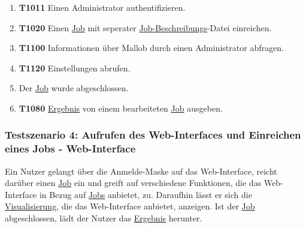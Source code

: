 \begin{enumerate}
        
    \item \textbf{T1011} Einen \gls{Administrator} authentifizieren. 
    
    \item \textbf{T1020} Einen \hyperref[B:Jobs]{Job} mit seperater \hyperref[B:Job-Beschreibung]{Job-Beschreibungs}-Datei einreichen. 
    
    \item \textbf{T1100} Informationen über \gls{Mallob} durch einen \gls{Administrator} abfragen. 
    
    \item \textbf{T1120} Einstellungen abrufen.

    \item Der  \hyperref[B:Jobs]{Job} wurde abgeschlossen.
    
    \item \textbf{T1080} \hyperref[B:Job-Ergebnis]{Ergebnis} von einem bearbeiteten  \hyperref[B:Jobs]{Job} ausgeben. 
    
\end{enumerate}

\subsubsection{Testszenario 4: Aufrufen des Web-Interfaces und Einreichen eines Jobs - Web-Interface}
Ein \gls{Nutzer} gelangt über die Anmelde-Maske auf das \gls{Web-Interface}, reicht darüber einen \hyperref[B:Jobs]{Job} ein und greift auf verschiedene Funktionen, die das \gls{Web-Interface} in Bezug auf \hyperref[B:Jobs]{Jobs} anbietet, zu. Daraufhin lässt er sich die \hyperref[pages:visualization]{Visualisierung}, die das \gls{Web-Interface} anbietet, anzeigen. Ist der  \hyperref[B:Jobs]{Job} abgeschlossen, lädt der \gls{Nutzer} das \hyperref[B:Job-Ergebnis]{Ergebnis} herunter.

